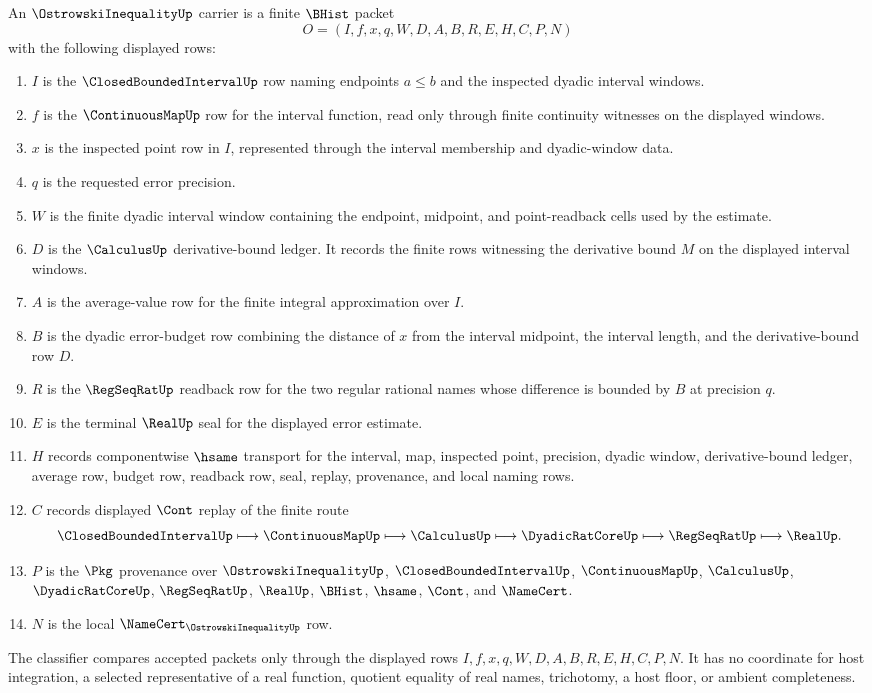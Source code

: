 \begin{definition}
\label{def:ostrowski-inequality-carrier}
An $\OstrowskiInequalityUp$ carrier is a finite $\BHist$ packet
$$
O=(I,f,x,q,W,D,A,B,R,E,H,C,P,N)
$$
with the following displayed rows:
\begin{enumerate}
\item $I$ is the $\ClosedBoundedIntervalUp$ row naming endpoints $a\leq b$ and the inspected dyadic interval windows.
\item $f$ is the $\ContinuousMapUp$ row for the interval function, read only through finite continuity witnesses on the displayed windows.
\item $x$ is the inspected point row in $I$, represented through the interval membership and dyadic-window data.
\item $q$ is the requested error precision.
\item $W$ is the finite dyadic interval window containing the endpoint, midpoint, and point-readback cells used by the estimate.
\item $D$ is the $\CalculusUp$ derivative-bound ledger. It records the finite rows witnessing the derivative bound $M$ on the displayed interval windows.
\item $A$ is the average-value row for the finite integral approximation over $I$.
\item $B$ is the dyadic error-budget row combining the distance of $x$ from the interval midpoint, the interval length, and the derivative-bound row $D$.
\item $R$ is the $\RegSeqRatUp$ readback row for the two regular rational names whose difference is bounded by $B$ at precision $q$.
\item $E$ is the terminal $\RealUp$ seal for the displayed error estimate.
\item $H$ records componentwise $\hsame$ transport for the interval, map, inspected point, precision, dyadic window, derivative-bound ledger, average row, budget row, readback row, seal, replay, provenance, and local naming rows.
\item $C$ records displayed $\Cont$ replay of the finite route
$$
\ClosedBoundedIntervalUp \longmapsto \ContinuousMapUp \longmapsto \CalculusUp \longmapsto \DyadicRatCoreUp \longmapsto \RegSeqRatUp \longmapsto \RealUp .
$$
\item $P$ is the $\Pkg$ provenance over $\OstrowskiInequalityUp$, $\ClosedBoundedIntervalUp$, $\ContinuousMapUp$, $\CalculusUp$, $\DyadicRatCoreUp$, $\RegSeqRatUp$, $\RealUp$, $\BHist$, $\hsame$, $\Cont$, and $\NameCert$.
\item $N$ is the local $\NameCert_{\OstrowskiInequalityUp}$ row.
\end{enumerate}
The classifier compares accepted packets only through the displayed rows $I,f,x,q,W,D,A,B,R,E,H,C,P,N$. It has no coordinate for host integration, a selected representative of a real function, quotient equality of real names, trichotomy, a host floor, or ambient completeness.
\end{definition}

